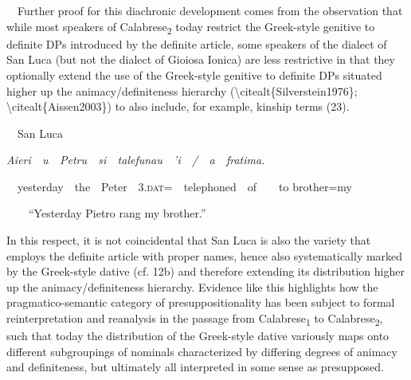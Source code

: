 \documentclass[output=paper,modfonts,nonflat]{langsci/langscibook}
\begin{document}
\begin{styleStandard}
\ \ Further proof for this diachronic development comes from the observation that while most speakers of Calabrese\textsubscript{2} today restrict the Greek-style genitive to definite DPs introduced by the definite article, some speakers of the dialect of San Luca (but not the dialect of Gioiosa Ionica) are less restrictive in that they optionally extend the use of the Greek-style genitive to definite DPs situated higher up the animacy/definiteness hierarchy ({\textbackslash}citealt\{Silverstein1976\}; {\textbackslash}citealt\{Aissen2003\}) to also include, for example, kinship terms (23).
\end{styleStandard}

\begin{listWWNumviiileveli}
\item 
\begin{styleListParagraph}
\ \ San Luca
\end{styleListParagraph}
\end{listWWNumviiileveli}
\begin{styleListParagraph}
\textit{Aieri\ \ u\ \ Petru\ \ si\ \ talefunau\ \ ’i\ \ /\ \ a\ \ fratima.}
\end{styleListParagraph}

\begin{styleStandard}
\ \ yesterday\ \ the\ \ Peter\ \ 3.\textsc{dat}=\ \ telephoned\ \ of\ \ \ \ to brother=my
\end{styleStandard}

\begin{styleStandard}
\ \ \ \ “Yesterday Pietro rang my brother.”
\end{styleStandard}

\begin{styleStandard}
In this respect, it is not coincidental that San Luca is also the variety that employs the definite article with proper names, hence also systematically marked by the Greek-style dative (cf. 12b) and therefore extending its distribution higher up the animacy/definiteness hierarchy. Evidence like this highlights how the pragmatico-semantic category of presuppositionality has been subject to formal reinterpretation and reanalysis in the passage from Calabrese\textsubscript{1} to Calabrese\textsubscript{2}, such that today the distribution of the Greek-style dative variously maps onto different subgroupings of nominals characterized by differing degrees of animacy and definiteness, but ultimately all interpreted in some sense as presupposed.
\end{styleStandard}
\end{document}
